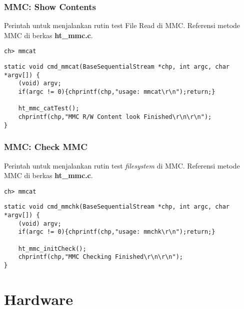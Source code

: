 \documentclass[12pt,]{article}
\begin{document}
	\subsubsection{MMC: Show Contents}
	Perintah untuk menjalankan rutin test File Read di MMC.
	Referensi metode MMC di berkas \textbf{ht\_mmc.c}.
	\begin{verbatim}
ch> mmcat
	\end{verbatim}
	
	\begin{verbatim}
static void cmd_mmcat(BaseSequentialStream *chp, int argc, char *argv[]) {
	(void) argv;
	if(argc != 0){chprintf(chp,"usage: mmcat\r\n");return;}
	
	ht_mmc_catTest();
	chprintf(chp,"MMC R/W Content look Finished\r\n\r\n");
}
	\end{verbatim}
	
	\subsubsection{MMC: Check MMC}
	Perintah untuk menjalankan rutin test \textit{filesystem} di MMC.
	Referensi metode MMC di berkas \textbf{ht\_mmc.c}.
	\begin{verbatim}
ch> mmcat
	\end{verbatim}
	
	\begin{verbatim}
static void cmd_mmchk(BaseSequentialStream *chp, int argc, char *argv[]) {
	(void) argv;
	if(argc != 0){chprintf(chp,"usage: mmchk\r\n");return;}
	
	ht_mmc_initCheck();
	chprintf(chp,"MMC Checking Finished\r\n\r\n");
}
	\end{verbatim}

	\newpage
	\section{Hardware}
\end{document}
